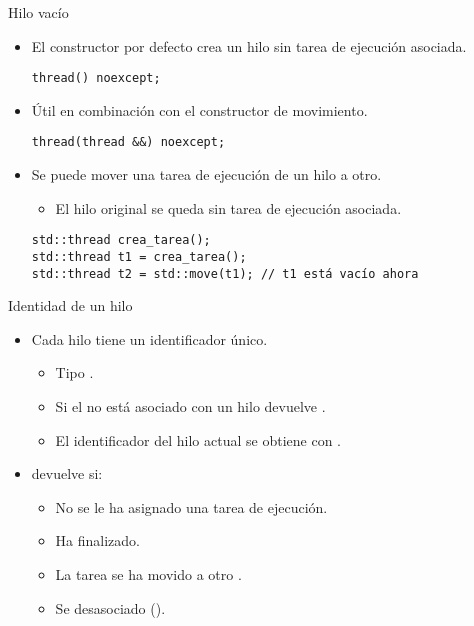 \begin{frame}[fragile]{Hilo vacío}
\begin{itemize}
  \item El constructor por defecto crea un hilo sin tarea de ejecución asociada.
\begin{lstlisting}
thread() noexcept;
\end{lstlisting}
  \item Útil en combinación con el constructor de movimiento.
\begin{lstlisting}
thread(thread &&) noexcept;
\end{lstlisting}
  \item Se puede mover una tarea de ejecución de un hilo a otro.
    \begin{itemize}
      \item El hilo original se queda sin tarea de ejecución asociada.
    \end{itemize}
\begin{lstlisting}
std::thread crea_tarea();
std::thread t1 = crea_tarea();
std::thread t2 = std::move(t1); // t1 está vacío ahora
\end{lstlisting}
\end{itemize}
\end{frame}

\begin{frame}{Identidad de un hilo}
\begin{itemize}
  \item Cada hilo tiene un identificador único.
    \begin{itemize}
      \item Tipo .
      \item Si el  no está asociado con un hilo  devuelve .
      \item El identificador del hilo actual se obtiene con .
    \end{itemize}
  \vfill
  \item {} devuelve  si:
    \begin{itemize}
      \item No se le ha asignado una tarea de ejecución.
      \item Ha finalizado.
      \item La tarea se ha movido a otro .
      \item Se desasociado ().
    \end{itemize}
\end{itemize}
\end{frame}

